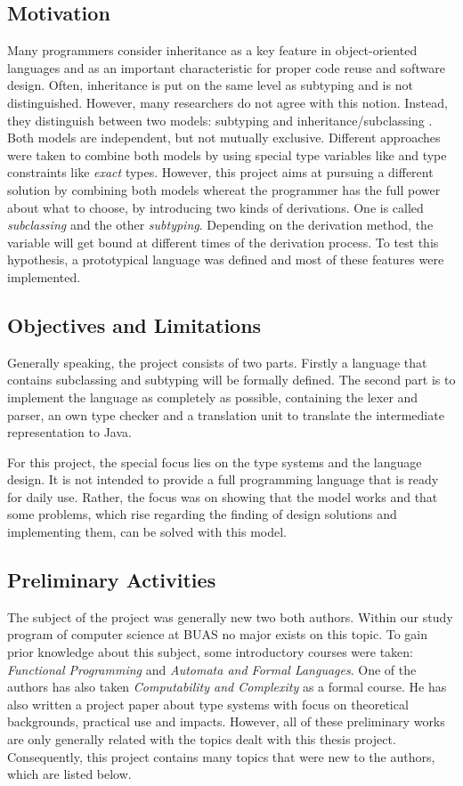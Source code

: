 \subsection{Motivation}
Many programmers consider inheritance as a key feature in object-oriented
languages and as an important characteristic for proper code reuse and
software design. Often, inheritance is put on the same level as subtyping
and is not distinguished. However, many researchers do not agree with
this notion. Instead, they distinguish between two models: subtyping and
inheritance/subclassing \cite{taivalsaari_notion_1996}.
Both models are independent, but not mutually exclusive. Different approaches were
taken to combine both models by using special type variables like \mytype
and type constraints like \emph{exact} types. However, this project aims at
pursuing a different solution by combining both models whereat the programmer has
the full power about what to choose, by introducing two kinds of derivations.
One is called \emph{subclassing} and the other \emph{subtyping}. Depending
on the derivation method, the \mytype variable will get bound at different
times of the derivation process. To test this hypothesis, a prototypical
language was defined and most of these features were implemented.

\subsection{Objectives and Limitations}
Generally speaking, the project consists of two parts. Firstly a language
that contains subclassing and subtyping will be formally defined. The
second part is to implement the language as completely as possible, containing
the lexer and parser, an own type checker and a translation unit to translate
the intermediate representation to Java.

For this project, the special focus lies on the type systems and the language
design. It is not intended to provide a full programming language that is
ready for daily use. Rather, the focus was on showing that the model works and that some
problems, which rise regarding the finding of design solutions and implementing them, can be solved
with this model.

\subsection{Preliminary Activities}
The subject of the project was generally new two both authors. Within
our study program of computer science at BUAS no major exists on this topic. To gain prior
knowledge about this subject, some introductory courses were taken:
\emph{Functional Programming} and \emph{Automata and Formal Languages}.
One of the authors has also taken \emph{Computability and Complexity} as
a formal course. He has also written a project paper about type systems
with focus on theoretical backgrounds, practical use and impacts. However, all
of these preliminary works are only generally related with the topics dealt with
this thesis project. Consequently, this project contains many topics that
were new to the authors, which are listed below.

